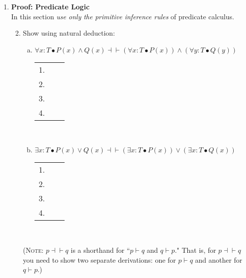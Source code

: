 \documentclass{article}
\begin{document}
\begin{enumerate}[\bf I.]
\item \textbf{Proof: Predicate Logic}\\[6pt]
In this section {\em use only the primitive inference rules} of predicate
calculus.
\begin{enumerate}[1.] \setcounter{enumii}{1}
\item Show using natural deduction:
\begin{enumerate}[a.]
\item $\forall x:T\bullet P(x)\land Q(x)\dashv
  \vdash (\forall x:T\bullet P(x))\land (\forall y:T\bullet Q(y))$ \\
  \begin{tabular}{l ll}
    1. & & \\
    2. & & \\
    3. & & \\
    4. & & \\
   \end{tabular} \\
\item $\exists x:T\bullet P(x) \lor Q(x) \dashv \vdash
  (\exists x:T \bullet P(x)) \lor (\exists x:T \bullet Q(x))$ \\
  \begin{tabular}{l ll}
    1. &  & \\
    2. &  & \\
    3. &  & \\
    4. &  & \\
   \end{tabular} \\
\end{enumerate}
(\textsc{Note}: $p \dashv\vdash q$ is a shorthand for ``$p \vdash q$
and $q \vdash p$." That is, for $p \dashv \vdash q$ you need to show
two separate derivations: one for $p \vdash q$ and another for $q
\vdash p$.)
\end{enumerate}

\end{enumerate}
\end{document}
